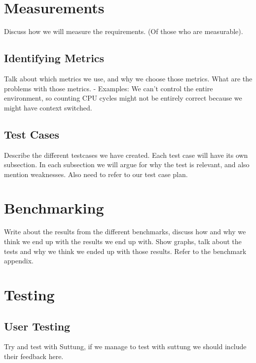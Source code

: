 \chapter{Measurements}
\label{chap:measurements}
Discuss how we will measure the requirements. (Of those who are measurable).

\section{Identifying Metrics}
Talk about which metrics we use, and why we choose those metrics.
What are the problems with those metrics.
- Examples: We can't control the entire environment, so counting CPU cycles might not be entirely correct because we might have context switched.

\section{Test Cases}
Describe the different testcases we have created. Each test case will have its own subsection.
In each subsection we will argue for why the test is relevant, and also mention weaknesses.
Also need to refer to our test case plan.

\chapter{Benchmarking}
\label{chap:benchmarking}
Write about the results from the different benchmarks,
discuss how and why we think we end up with the results we end up with.
Show graphs, talk about the tests and why we think we ended up with those results.
Refer to the benchmark appendix.

\chapter{Testing}
\label{chap:testing}

\section{User Testing}
Try and test with Suttung, if we manage to test with suttung
we should include their feedback here.

